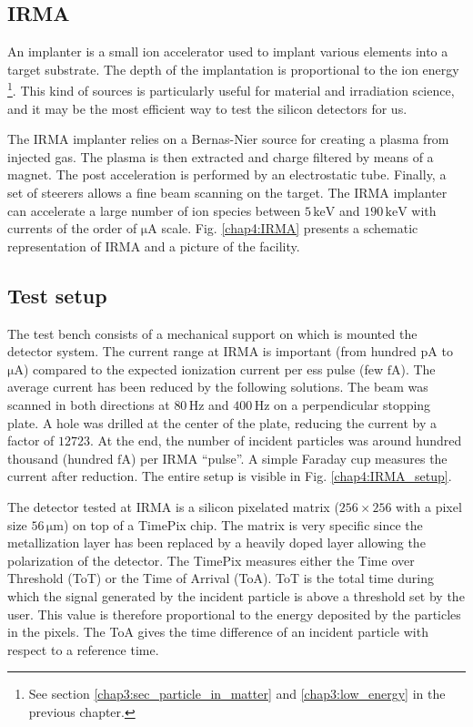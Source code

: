\begin{refsection}
  \subsection{IRMA}
  An implanter is a small ion accelerator used to implant various elements into a target substrate. The depth of the implantation is proportional to the ion energy \footnote{See section \ref{chap3:sec_particle_in_matter} and \ref{chap3:low_energy} in the previous chapter.}. This kind of sources is particularly useful for material and irradiation science, and it may be the most efficient way to test the silicon detectors for us.

  The IRMA implanter \cite{Chaumont1981} relies on a Bernas-Nier source \cite{Paris1981} for creating a plasma from injected gas. The plasma is then extracted and charge filtered by means of a magnet. The post acceleration is performed by an electrostatic tube. Finally, a set of steerers allows a fine beam scanning on the target. The IRMA implanter can accelerate a large number of ion species between $5 \,\mathrm{keV}$ and $190 \,\mathrm{keV}$ with currents of the order of $\mathrm{\mu A}$ scale. Fig. \ref{chap4:IRMA} presents a schematic representation of IRMA and a picture of the facility.

  

  \subsection{Test setup}

  The test bench consists of a mechanical support on which is mounted the detector system. The current range at IRMA is important (from hundred $\mathrm{pA}$ to $\mathrm{\mu A}$) compared to the expected ionization current per \acrshort{ess} pulse (few $\mathrm{fA}$). The average current has been reduced by the following solutions. The beam was scanned in both directions at $80 \,\mathrm{Hz}$ and $400\,\mathrm{Hz}$ on a perpendicular stopping plate. A hole was drilled at the center of the plate, reducing the current by a factor of $12723$. At the end, the number of incident particles was around hundred thousand (hundred $\mathrm{fA}$) per IRMA “pulse”. A simple Faraday cup measures the current after reduction. The entire setup is visible in Fig. \ref{chap4:IRMA_setup}.

  

  The detector tested at IRMA is a silicon pixelated matrix ($256 \times 256$ with a pixel size $56\,\mathrm{\mu m}$) on top of a TimePix chip. The matrix is very specific since the metallization layer has been replaced by a heavily doped layer allowing the polarization of the detector. The TimePix measures either the Time over Threshold (ToT) or the Time of Arrival (ToA). ToT is the total time during which the signal generated by the incident particle is above a threshold set by the user. This value is therefore proportional to the energy deposited by the particles in the pixels. The ToA gives the time difference of an incident particle with respect to a reference time.


\end{refsection}
